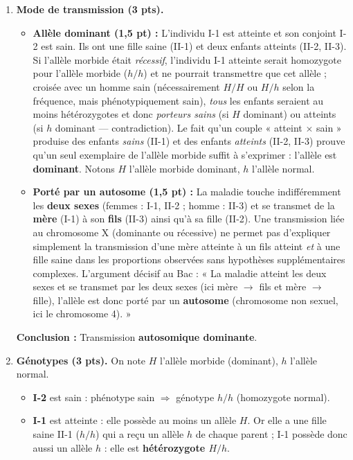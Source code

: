 \documentclass[11pt]{article}
\begin{document}
\begin{corrige}
\begin{enumerate}
\item \textbf{Mode de transmission (3 pts).}
\begin{itemize}
\item \textbf{Allèle dominant (1,5 pt) :} L'individu I-1 est atteinte et son conjoint I-2 est sain. Ils ont une fille saine (II-1) et deux enfants atteints (II-2, II-3). Si l'allèle morbide était \emph{récessif}, l'individu I-1 atteinte serait homozygote pour l'allèle morbide ($h/h$) et ne pourrait transmettre que cet allèle ; croisée avec un homme sain (nécessairement $H/H$ ou $H/h$ selon la fréquence, mais phénotypiquement sain), \emph{tous} les enfants seraient au moins hétérozygotes et donc \emph{porteurs sains} (si $H$ dominant) ou atteints (si $h$ dominant — contradiction). Le fait qu'un couple « atteint $\times$ sain » produise des enfants \emph{sains} (II-1) et des enfants \emph{atteints} (II-2, II-3) prouve qu'un seul exemplaire de l'allèle morbide suffit à s'exprimer : l'allèle est \textbf{dominant}. Notons $H$ l'allèle morbide dominant, $h$ l'allèle normal.
\item \textbf{Porté par un autosome (1,5 pt) :} La maladie touche indifféremment les \textbf{deux sexes} (femmes : I-1, II-2 ; homme : II-3) et se transmet de la \textbf{mère} (I-1) à son \textbf{fils} (II-3) ainsi qu'à sa fille (II-2). Une transmission liée au chromosome X (dominante ou récessive) ne permet pas d'expliquer simplement la transmission d'une mère atteinte à un fils atteint \emph{et} à une fille saine dans les proportions observées sans hypothèses supplémentaires complexes. L'argument décisif au Bac : « La maladie atteint les deux sexes et se transmet par les deux sexes (ici mère $\rightarrow$ fils et mère $\rightarrow$ fille), l'allèle est donc porté par un \textbf{autosome} (chromosome non sexuel, ici le chromosome 4). »
\end{itemize}
\textbf{Conclusion :} Transmission \textbf{autosomique dominante}.
\item \textbf{Génotypes (3 pts).} On note $H$ l'allèle morbide (dominant), $h$ l'allèle normal.
\begin{itemize}
\item \textbf{I-2} est sain : phénotype sain $\Rightarrow$ génotype \textbf{$h/h$} (homozygote normal).
\item \textbf{I-1} est atteinte : elle possède au moins un allèle $H$. Or elle a une fille saine II-1 ($h/h$) qui a reçu un allèle $h$ de chaque parent ; I-1 possède donc aussi un allèle $h$ : elle est \textbf{hétérozygote $H/h$}.

\end{itemize}
\end{enumerate}
\end{corrige}
\end{document}
